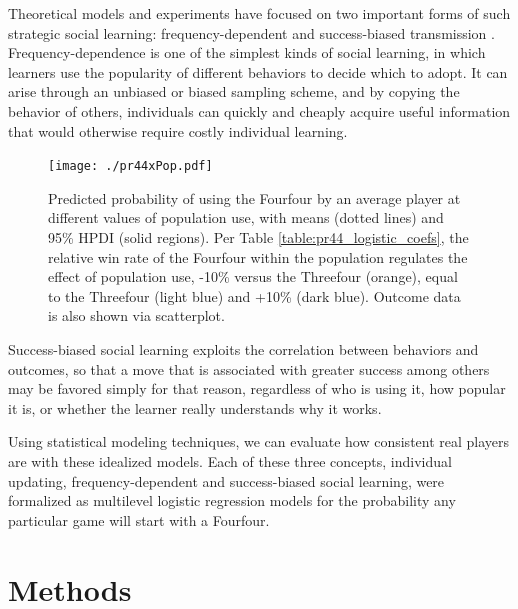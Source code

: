 \documentclass[reqno,12pt]{amsart}
\begin{document}
Theoretical models and experiments have focused on two important forms of such strategic social learning: frequency-dependent and success-biased transmission \citep{boyd1985culture, mcelreath2008successbias}. Frequency-dependence is one of the simplest kinds of social learning, in which learners use the popularity of different behaviors to decide which to adopt. It can arise through an unbiased or biased sampling scheme, and by copying the behavior of others, individuals can quickly and cheaply acquire useful information that would otherwise require costly individual learning.

\begin{figure}[t]
  \begin{center}
    \texttt{[image: ./pr44xPop.pdf]}
    \caption{Predicted probability of using the Fourfour by an average player at different values of population use, with means (dotted lines) and 95\% HPDI (solid regions). Per Table \ref{table:pr44_logistic_coefs}, the relative win rate of the Fourfour within the population regulates the effect of population use, -10\% versus the Threefour (orange), equal to the Threefour (light blue) and +10\% (dark blue). Outcome data is also shown via scatterplot.}
    \label{fig:pr44}
  \end{center}
\end{figure}

Success-biased social learning exploits the correlation between behaviors and outcomes, so that a move that is associated with greater success among others may be favored simply for that reason, regardless of who is using it, how popular it is, or whether the learner really understands why it works.

Using statistical modeling techniques, we can evaluate how consistent real players are with these idealized models. Each of these three concepts, individual updating, frequency-dependent and success-biased social learning, were formalized as multilevel logistic regression models for the probability any particular game will start with a Fourfour.

\section{Methods}
\end{document}

